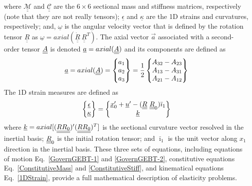 where $\underline{\underline{\mathcal{M}}}$ and
$\underline{\underline{\mathcal{C}}}$ are the $6 \times 6$ sectional mass
and stiffness matrices, respectively (note that they are not really tensors);
$\underline{\epsilon}$ and $\underline{\kappa}$ are the 1D strains and
curvatures, respectively; and, $\underline{\omega}$ is the angular velocity
vector that is defined by the rotation tensor $\underline{\underline{R}}$ as
$\underline{\omega} =
axial(\dot{\underline{\underline{R}}}~\underline{\underline{R}}^T)$. 
The axial vector $\vec{a}$ associated with a second-order tensor $\underline{\underline{A}}$ is denoted $\underline{a}=axial(\underline{\underline{A}})$ and its components are defined as
\begin{equation}
    \label{axial}
    \underline{a} = axial(\underline{\underline{A}})=\begin{Bmatrix}
    a_1 \\
    a_2 \\
    a_3
    \end{Bmatrix}
    =\frac{1}{2}
    \begin{Bmatrix}
    A_{32}-A_{23} \\
    A_{13}-A_{31} \\
    A_{21}-A_{12}
    \end{Bmatrix}
\end{equation}
The 1D strain measures are defined as
\begin{equation}
    \label{1DStrain}
    \begin{Bmatrix}
        \underline{\epsilon} \\
        \underline{\kappa}
    \end{Bmatrix}
    =
    \begin{Bmatrix}
        \underline{x}^\prime_0 + \underline{u}^\prime - (\underline{\underline{R}} ~\underline{\underline{R}}_0) \bar{\imath}_1 \\
        \underline{k}
    \end{Bmatrix}
\end{equation}
where $\underline{k} = axial [(\underline{\underline{R R_0}})^\prime (\underline{\underline{R R_0}})^T]$ is the sectional
curvature vector resolved in the inertial basis; $\underline{\underline{R}}_0$ is the initial rotation tensor; and $\bar{\imath}_1$ is the unit vector along $x_1$ direction in the inertial basis. 
These three sets of equations, including equations of motion Eq.~\eqref{GovernGEBT-1} and \eqref{GovernGEBT-2}, constitutive equations
Eq.~\eqref{ConstitutiveMass} and \eqref{ConstitutiveStiff}, and kinematical
equations Eq.~\eqref{1DStrain}, provide a full mathematical description of elasticity problems. 

